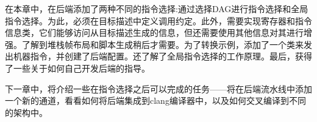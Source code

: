 在本章中，在后端添加了两种不同的指令选择:通过选择DAG进行指令选择和全局指令选择。为此，必须在目标描述中定义调用约定。此外，需要实现寄存器和指令信息类，它们能够访问从目标描述生成的信息，但还需要使用其他信息对其进行增强。了解到堆栈帧布局和脚本生成稍后才需要。为了转换示例，添加了一个类来发出机器指令，并创建了后端配置。还了解了全局指令选择的工作原理。最后，获得了一些关于如何自己开发后端的指导。

下一章中，将介绍一些在指令选择之后可以完成的任务——将在后端流水线中添加一个新的通道，看看如何将后端集成到clang编译器中，以及如何交叉编译到不同的架构中。

